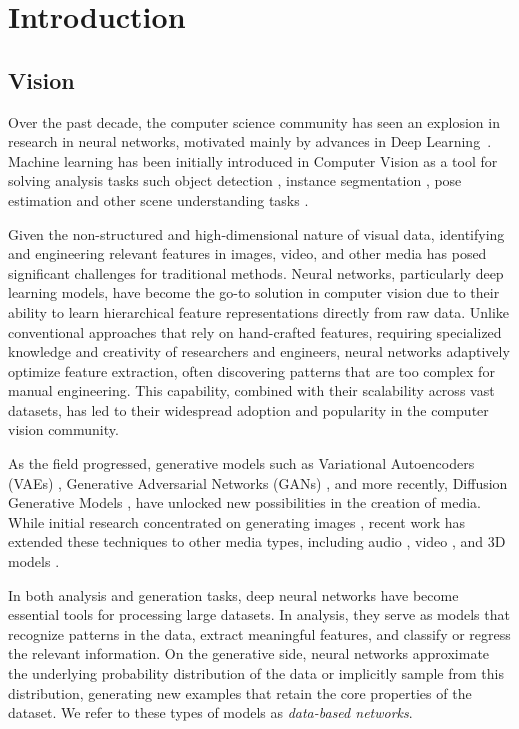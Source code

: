 \chapter{Introduction}

\section{Vision}

Over the past decade, the computer science community has seen an explosion in research in neural networks, motivated mainly by advances in Deep Learning~\cite{lecun2015deep,goodfellow2016deep}. Machine learning has been initially introduced in Computer Vision as a tool for solving analysis tasks such object detection \citep{redmon2016you}, instance segmentation \citep{he2017mask}, pose estimation \citep{cao2019openpose} and other scene understanding tasks \citep{eigen2014depth, long2015fully, vinyals2015show, guler2018densepose}. 

Given the non-structured and high-dimensional nature of visual data, identifying and engineering relevant features in images, video, and other media has posed significant challenges for traditional methods. Neural networks, particularly deep learning models, have become the go-to solution in computer vision due to their ability to learn hierarchical feature representations directly from raw data. Unlike conventional approaches that rely on hand-crafted features, requiring specialized knowledge and creativity of researchers and engineers, neural networks adaptively optimize feature extraction, often discovering patterns that are too complex for manual engineering. This capability, combined with their scalability across vast datasets, has led to their widespread adoption and popularity in the computer vision community.

As the field progressed, generative models such as Variational Autoencoders (VAEs) \citep{kingma2014auto}, Generative Adversarial Networks (GANs) \citep{goodfellow2014generative}, and more recently, Diffusion Generative Models \citep{ho2020denoising}, have unlocked new possibilities in the creation of media. While initial research concentrated on generating images \citep{karras2017progressive}, recent work has extended these techniques to other media types, including audio \citep{donahue2018adversarial}, video \citep{vondrick2016generating}, and 3D models \citep{wu2016shapenets}.

In both analysis and generation tasks, deep neural networks have become essential tools for processing large datasets. In analysis, they serve as models that recognize patterns in the data, extract meaningful features, and classify or regress the relevant information. On the generative side, neural networks approximate the underlying probability distribution of the data or implicitly sample from this distribution, generating new examples that retain the core properties of the dataset. We refer to these types of models as \textit{data-based networks}.

